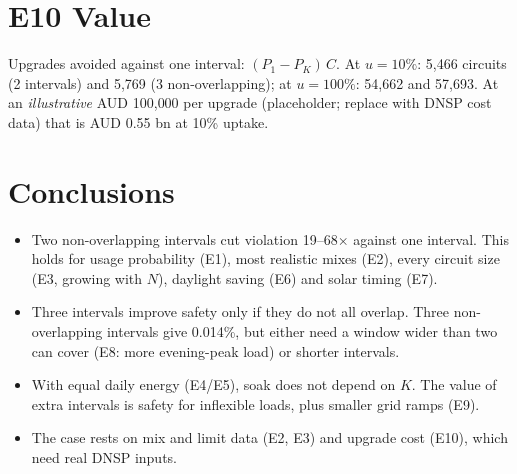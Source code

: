 \documentclass[10.5pt,a4paper]{article}
\begin{document}
\section{E10 Value}
Upgrades avoided against one interval: \((P_1-P_K)\,C\). At \(u=10\%\): 5{,}466 circuits (2 intervals)
and 5{,}769 (3 non-overlapping); at \(u=100\%\): 54{,}662 and 57{,}693. At an \emph{illustrative}
AUD 100{,}000 per upgrade (placeholder; replace with DNSP cost data) that is AUD 0.55 bn at 10\% uptake.

\section*{Conclusions}
\begin{itemize}\itemsep0pt
\item Two non-overlapping intervals cut violation 19--68\(\times\) against one interval. This holds for usage
  probability (E1), most realistic mixes (E2), every circuit size (E3, growing with \(N\)), daylight
  saving (E6) and solar timing (E7).
\item Three intervals improve safety only if they do not all overlap. Three non-overlapping intervals give 0.014\%,
  but either need a window wider than two can cover (E8: more evening-peak load) or shorter intervals.
\item With equal daily energy (E4/E5), soak does not depend on \(K\). The value of extra intervals is
  safety for inflexible loads, plus smaller grid ramps (E9).
\item The case rests on mix and limit data (E2, E3) and upgrade cost (E10), which need real DNSP inputs.
\end{itemize}
\end{document}
